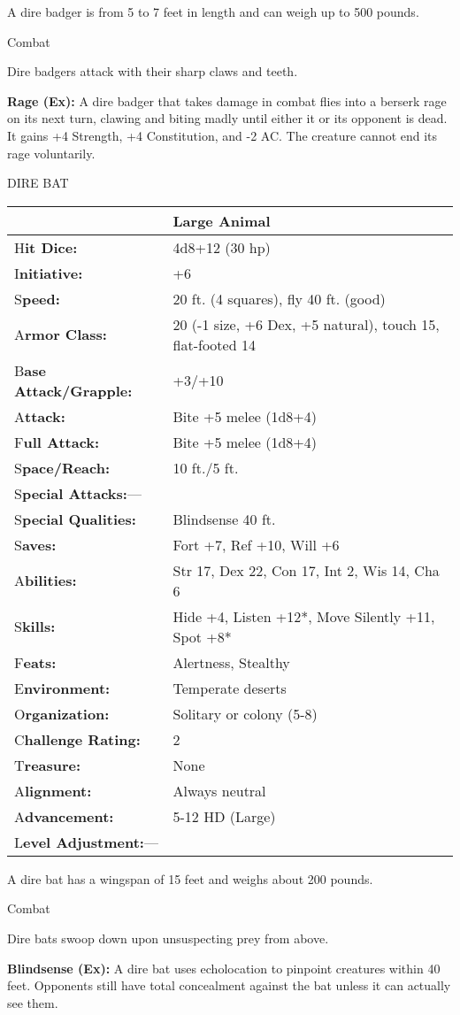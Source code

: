 \documentclass{article}
\begin{document}
A dire badger is from 5 to 7 feet in length and can weigh up to 500 pounds.

Combat

Dire badgers attack with their sharp claws and teeth.

\textbf{Rage (Ex): }A dire badger that takes damage in combat flies into a berserk 
rage on its next turn, clawing and biting madly until either it or its opponent 
is dead. It gains +4 Strength, +4 Constitution, and -2 AC. The creature cannot 
end its rage voluntarily.

\vspace{12pt}
DIRE BAT

\begin{tabular}{|>{\raggedright}p{91pt}|>{\raggedright}p{226pt}|}
\hline
  & Large Animal\tabularnewline
\hline
H\textbf{it Dice:} & 4d8+12 (30 hp)\tabularnewline
\hline
I\textbf{nitiative:} & +6\tabularnewline
\hline
S\textbf{peed:} & 20 ft. (4 squares), fly 40 ft. (good)\tabularnewline
\hline
A\textbf{rmor Class:} & 20 (-1 size, +6 Dex, +5 natural), touch 15, flat-footed 
14\tabularnewline
\hline
B\textbf{ase Attack/Grapple:} & +3/+10\tabularnewline
\hline
A\textbf{ttack:} & Bite +5 melee (1d8+4)\tabularnewline
\hline
F\textbf{ull Attack:} & Bite +5 melee (1d8+4)\tabularnewline
\hline
S\textbf{pace/Reach:} & 10 ft./5 ft.\tabularnewline
\hline
S\textbf{pecial Attacks:}--- & \tabularnewline
\hline
S\textbf{pecial Qualities:} & Blindsense 40 ft.\tabularnewline
\hline
S\textbf{aves:} & Fort +7, Ref +10, Will +6\tabularnewline
\hline
A\textbf{bilities:} & Str 17, Dex 22, Con 17, Int 2, Wis 14, Cha 6\tabularnewline
\hline
S\textbf{kills:} & Hide +4, Listen +12*, Move Silently +11, Spot +8*\tabularnewline
\hline
F\textbf{eats:} & Alertness, Stealthy\tabularnewline
\hline
E\textbf{nvironment:} & Temperate deserts\tabularnewline
\hline
O\textbf{rganization:} & Solitary or colony (5-8)\tabularnewline
\hline
C\textbf{hallenge Rating:} & 2\tabularnewline
\hline
T\textbf{reasure:} & None\tabularnewline
\hline
A\textbf{lignment:} & Always neutral\tabularnewline
\hline
A\textbf{dvancement:} & 5-12 HD (Large)\tabularnewline
\hline
L\textbf{evel Adjustment:}--- & \tabularnewline
\hline
\end{tabular}

A dire bat has a wingspan of 15 feet and weighs about 200 pounds.

Combat

Dire bats swoop down upon unsuspecting prey from above.

\textbf{Blindsense (Ex):} A dire bat uses echolocation to pinpoint creatures within 
40 feet. Opponents still have total concealment against the bat unless it can actually 
see them.
\end{document}
